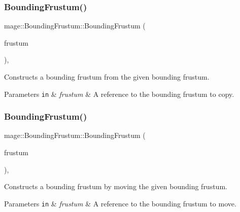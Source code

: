 \subsubsection{\texorpdfstring{Bounding\+Frustum()}{BoundingFrustum()}\hspace{0.1cm}{\footnotesize\ttfamily [2/3]}}
{\footnotesize\ttfamily mage\+::\+Bounding\+Frustum\+::\+Bounding\+Frustum (\begin{DoxyParamCaption}\item[{const \mbox{\hyperlink{classmage_1_1_bounding_frustum}{Bounding\+Frustum}} \&}]{frustum }\end{DoxyParamCaption})\hspace{0.3cm}{\ttfamily [default]}, {\ttfamily [noexcept]}}

Constructs a bounding frustum from the given bounding frustum.


\begin{DoxyParams}[1]{Parameters}
\mbox{\tt in}  & {\em frustum} & A reference to the bounding frustum to copy. \\
\hline
\end{DoxyParams}
\mbox{\label{classmage_1_1_bounding_frustum_a0eafed7a78a72d33a6153bdcffd07057}} 
\subsubsection{\texorpdfstring{Bounding\+Frustum()}{BoundingFrustum()}\hspace{0.1cm}{\footnotesize\ttfamily [3/3]}}
{\footnotesize\ttfamily mage\+::\+Bounding\+Frustum\+::\+Bounding\+Frustum (\begin{DoxyParamCaption}\item[{\mbox{\hyperlink{classmage_1_1_bounding_frustum}{Bounding\+Frustum}} \&\&}]{frustum }\end{DoxyParamCaption})\hspace{0.3cm}{\ttfamily [default]}, {\ttfamily [noexcept]}}

Constructs a bounding frustum by moving the given bounding frustum.


\begin{DoxyParams}[1]{Parameters}
\mbox{\tt in}  & {\em frustum} & A reference to the bounding frustum to move. \\
\hline
\end{DoxyParams}
\mbox{\label{classmage_1_1_bounding_frustum_a9837a92462da6a473f6ba5b7cc3b77fb}} 
